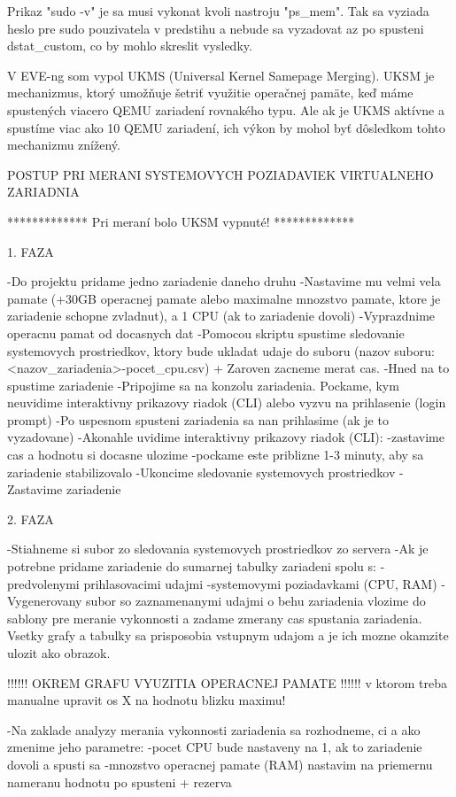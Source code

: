Prikaz "sudo -v" je sa musi vykonat kvoli nastroju "ps\_mem". Tak sa vyziada
heslo pre sudo pouzivatela v predstihu a nebude sa vyzadovat az po spusteni
dstat\_custom, co by mohlo skreslit vysledky.

V EVE-ng som vypol UKMS (Universal Kernel Samepage Merging). UKSM je 
mechanizmus, ktorý umožňuje šetriť využitie operačnej pamäte, keď máme 
spustených viacero QEMU zariadení rovnakého typu. Ale ak je UKMS aktívne
a spustíme viac ako 10 QEMU zariadení, ich výkon by mohol byť dôsledkom
tohto mechanizmu znížený.

POSTUP PRI MERANI SYSTEMOVYCH POZIADAVIEK VIRTUALNEHO ZARIADNIA

*************
Pri meraní bolo UKSM vypnuté!
*************

1. FAZA

-Do projektu pridame jedno zariadenie daneho druhu
-Nastavime mu velmi vela pamate (+30GB operacnej pamate alebo maximalne 
 mnozstvo pamate, ktore je zariadenie schopne zvladnut), 
 a 1 CPU (ak to zariadenie dovoli)
-Vyprazdnime operacnu pamat od docasnych dat
-Pomocou skriptu spustime sledovanie systemovych prostriedkov, ktory bude ukladat 
  udaje do suboru (nazov suboru: <nazov\_zariadenia>-pocet\_cpu.csv)
  +
  Zaroven zacneme merat cas.
-Hned na to spustime zariadenie
-Pripojime sa na konzolu zariadenia. Pockame, kym neuvidime interaktivny prikazovy
  riadok (CLI) alebo vyzvu na prihlasenie (login prompt)
-Po uspesnom spusteni zariadenia sa nan prihlasime (ak je to vyzadovane)
-Akonahle uvidime interaktivny prikazovy riadok (CLI):
  -zastavime cas a hodnotu si docasne ulozime
  -pockame este priblizne 1-3 minuty, aby sa zariadenie stabilizovalo
-Ukoncime sledovanie systemovych prostriedkov
-Zastavime zariadenie


2. FAZA

-Stiahneme si subor zo sledovania systemovych prostriedkov zo servera
-Ak je potrebne pridame zariadenie do sumarnej tabulky zariadeni spolu s:
  -predvolenymi prihlasovacimi udajmi
  -systemovymi poziadavkami (CPU, RAM)
-Vygenerovany subor so zaznamenanymi udajmi o behu zariadenia vlozime do
  sablony pre meranie vykonnosti a zadame zmerany cas spustania zariadenia.
  Vsetky grafy a tabulky sa prisposobia vstupnym udajom a je ich mozne okamzite
  ulozit ako obrazok.

  !!!!!! OKREM GRAFU VYUZITIA OPERACNEJ PAMATE !!!!!! v ktorom treba manualne 
  upravit os X na hodnotu blizku maximu!

-Na zaklade analyzy merania vykonnosti zariadenia sa rozhodneme, ci a ako zmenime 
  jeho parametre:
  -pocet CPU bude nastaveny na 1, ak to zariadenie dovoli a spusti sa
  -mnozstvo operacnej pamate (RAM) nastavim na priemernu nameranu hodnotu 
    po spusteni + rezerva

